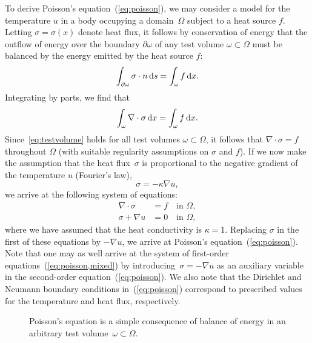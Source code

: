 To derive Poisson's equation~(\ref{eq:poisson}), we may consider a
model for the temperature $u$ in a body occupying a domain~$\Omega$
subject to a heat source $f$. Letting $\sigma = \sigma(x)$ denote heat
flux, it follows by conservation of energy that the outflow of energy
over the boundary $\partial\omega$ of any test volume
$\omega\subset\Omega$ must be balanced by the energy emitted by the
heat source $f$:
\begin{equation}
  \int_{\partial\omega} \sigma \cdot n \, \mathrm{d}s = \int_{\omega} f \, \mathrm{d}x.
\end{equation}
Integrating by parts, we find that
\begin{equation} \label{eq:testvolume}
  \int_{\omega} \nabla \cdot \sigma \, \mathrm{d}x = \int_{\omega} f \, \mathrm{d}x.
\end{equation}
Since~\eqref{eq:testvolume} holds for all test volumes
$\omega \subset \Omega$, it follows that $\nabla \cdot \sigma = f$
throughout $\Omega$ (with suitable regularity assumptions on $\sigma$
and $f$). If we now make the assumption that the heat flux~$\sigma$ is
proportional to the negative gradient of the temperature $u$
(Fourier's law), 
\begin{equation}
  \sigma = -\kappa \nabla u,
\end{equation}
we arrive at
the following system of equations:
\begin{equation}
\label{eq:poisson,mixed}
  \begin{split}
    \nabla \cdot \sigma &= f \quad \mbox{in } \Omega, \\
    \sigma + \nabla u   &= 0   \quad \mbox{in } \Omega,
\end{split}
\end{equation}
where we have assumed that the heat conductivity is $\kappa = 1$.
Replacing $\sigma$ in the first of these equations by $-\nabla u$, we
arrive at Poisson's equation~(\ref{eq:poisson}). Note that one may as
well arrive at the system of first-order
equations~(\ref{eq:poisson,mixed}) by introducing~$\sigma = -\nabla u$
as an auxiliary variable in the second-order
equation~(\ref{eq:poisson}). We also note that the Dirichlet and
Neumann boundary conditions in~(\ref{eq:poisson}) correspond to
prescribed values for the temperature and heat flux, respectively.

\begin{figure}
\bwfig
  \caption{Poisson's equation is a simple consequence of balance of
    energy in an arbitrary test volume~$\omega \subset \Omega$.}
\end{figure}

